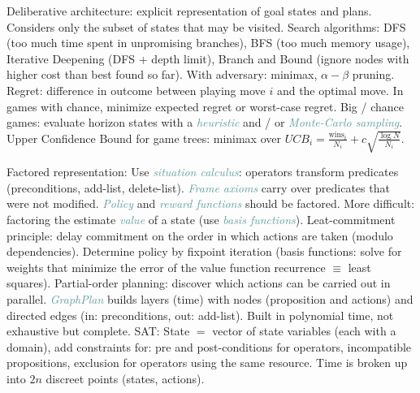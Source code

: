 \documentclass[10pt,a4paper,landscape]{article}
\newcommand{\concept}[1]{\textcolor{Emerald}{#1}} %
\newcommand{\subconcept}[1]{\textcolor{CadetBlue}{\textit{#1}}}
\newcommand{\opt}[1]{#1}
\renewcommand{\opt}[1]{}
\renewcommand{\section}[1]{
    \vspace{-0.3cm}
    \begin{center}
      \color{Bittersweet}
      \hrulefill{\small~~#1~~}\hrulefill
    \end{center}
    \vspace{-0.3cm}
  }
\begin{document}
\begin{multicols*}{4}
\concept{Deliberative architecture}: explicit representation of goal states and plans. Considers only the subset of states that may be visited.
\concept{Search algorithms}: DFS (too much time spent in unpromising branches), BFS (too much memory usage), Iterative Deepening (DFS + depth limit), Branch and Bound (ignore nodes with higher cost than best found so far). With adversary: minimax, $\alpha-\beta$ pruning.
\concept{Regret}: difference in outcome between playing move $i$ and the optimal move. In games with chance, minimize expected regret or worst-case regret.
Big / chance games: evaluate horizon states with a \subconcept{heuristic} and / or \subconcept{Monte-Carlo sampling}.
\concept{Upper Confidence Bound} for game trees: minimax over $UCB_i = \frac{\text{wins}_i}{N_i} + c \sqrt{\frac{\log{N}}{N_i}}$\opt{ ($c$: exploration parameter)}.

\concept{Factored representation}:\opt{ circumvent state space explosion by modeling state features as predicates.} Use \subconcept{situation calculus}: operators transform predicates (preconditions, add-list, delete-list). \subconcept{Frame axioms} carry over predicates that were not modified.
\subconcept{Policy} and \subconcept{reward functions} should be factored. More difficult: factoring the estimate \subconcept{value} of a state (use \subconcept{basis functions}).
\concept{Leat-commitment principle}: delay commitment on the order in which actions are taken (modulo dependencies). Determine policy by fixpoint iteration (basis functions: solve for weights that minimize the error of the value function recurrence $\equiv$ least squares).
\concept{Partial-order planning}: discover which actions can be carried out in parallel.
\subconcept{GraphPlan} builds layers (time) with nodes (proposition and actions) and directed edges (in: preconditions, out: add-list). Built in polynomial time, not exhaustive but complete.
\concept{SAT}:\opt{ goal state search can be encoded as a CSP.} State $=$ vector of state variables (each with a domain), add constraints for: pre and post-conditions for operators, incompatible propositions, exclusion for operators using the same resource. Time is broken up into $2n$ discreet points (states, actions).

\section{Multiagent systems}


\end{multicols*}
\end{document}
